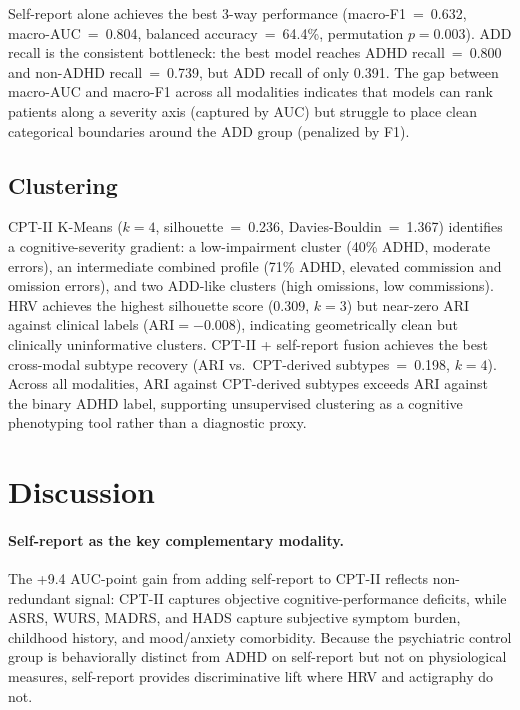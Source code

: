 \documentclass[11pt]{article}
\begin{document}
Self-report alone achieves the best 3-way performance (macro-F1~=~0.632, macro-AUC~=~0.804, balanced accuracy~=~64.4\%, permutation $p=0.003$). ADD recall is the consistent bottleneck: the best model reaches ADHD recall~=~0.800 and non-ADHD recall~=~0.739, but ADD recall of only 0.391. The gap between macro-AUC and macro-F1 across all modalities indicates that models can rank patients along a severity axis (captured by AUC) but struggle to place clean categorical boundaries around the ADD group (penalized by F1).

\subsection{Clustering}

CPT-II K-Means ($k=4$, silhouette~=~0.236, Davies-Bouldin~=~1.367) identifies a cognitive-severity gradient: a low-impairment cluster (40\% ADHD, moderate errors), an intermediate combined profile (71\% ADHD, elevated commission and omission errors), and two ADD-like clusters (high omissions, low commissions). HRV achieves the highest silhouette score (0.309, $k=3$) but near-zero ARI against clinical labels ($\text{ARI}=-0.008$), indicating geometrically clean but clinically uninformative clusters. CPT-II + self-report fusion achieves the best cross-modal subtype recovery (ARI vs.\ CPT-derived subtypes~=~0.198, $k=4$). Across all modalities, ARI against CPT-derived subtypes exceeds ARI against the binary ADHD label, supporting unsupervised clustering as a cognitive phenotyping tool rather than a diagnostic proxy.

\section{Discussion}

\paragraph{Self-report as the key complementary modality.} The +9.4 AUC-point gain from adding self-report to CPT-II reflects non-redundant signal: CPT-II captures objective cognitive-performance deficits, while ASRS, WURS, MADRS, and HADS capture subjective symptom burden, childhood history, and mood/anxiety comorbidity. Because the psychiatric control group is behaviorally distinct from ADHD on self-report but not on physiological measures, self-report provides discriminative lift where HRV and actigraphy do not.
\end{document}
